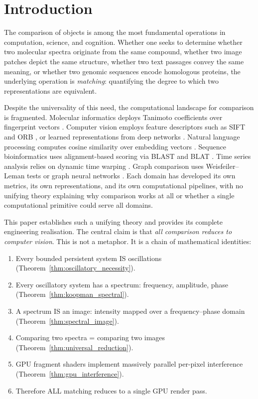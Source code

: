 \documentclass[11pt,twocolumn,a4paper]{article}
\begin{document}

\section{Introduction}
\label{sec:introduction}

The comparison of objects is among the most fundamental operations in
computation, science, and cognition. Whether one seeks to determine
whether two molecular spectra originate from the same compound, whether
two image patches depict the same structure, whether two text passages
convey the same meaning, or whether two genomic sequences encode
homologous proteins, the underlying operation is \emph{matching}:
quantifying the degree to which two representations are equivalent.

Despite the universality of this need, the computational landscape for
comparison is fragmented. Molecular informatics deploys Tanimoto
coefficients over fingerprint vectors \citep{willett1998, tanimoto1958}.
Computer vision employs feature descriptors such as SIFT \citep{lowe2004}
and ORB \citep{rublee2011}, or learned representations from deep networks
\citep{oquab2023}. Natural language processing computes cosine similarity
over embedding vectors \citep{vaswani2017, reimers2019}. Sequence
bioinformatics uses alignment-based scoring via BLAST \citep{altschul1990}
and BLAT \citep{kent2002}. Time series analysis relies on dynamic time
warping \citep{sakoe1978, berndt1994}. Graph comparison uses
Weisfeiler--Leman tests or graph neural networks \citep{kipf2017, xu2019}.
Each domain has developed its own metrics, its own representations, and
its own computational pipelines, with no unifying theory explaining why
comparison works at all or whether a single computational primitive could
serve all domains.

This paper establishes such a unifying theory and provides its complete
engineering realisation. The central claim is that \emph{all comparison
reduces to computer vision}. This is not a metaphor. It is a chain of
mathematical identities:

\begin{enumerate}[nosep]
  \item Every bounded persistent system IS oscillations
    (Theorem~\ref{thm:oscillatory_necessity}).
  \item Every oscillatory system has a spectrum: frequency, amplitude,
    phase (Theorem~\ref{thm:koopman_spectral}).
  \item A spectrum IS an image: intensity mapped over a frequency--phase
    domain (Theorem~\ref{thm:spectral_image}).
  \item Comparing two spectra = comparing two images
    (Theorem~\ref{thm:universal_reduction}).
  \item GPU fragment shaders implement massively parallel per-pixel
    interference (Theorem~\ref{thm:gpu_interference}).
  \item Therefore ALL matching reduces to a single GPU render pass.
\end{enumerate}
\end{document}

